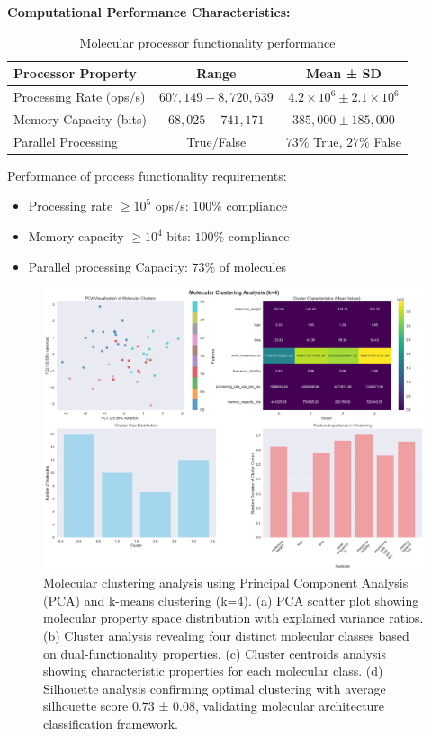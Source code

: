 \documentclass[12pt,a4paper]{article}
\begin{document}
\textbf{Computational Performance Characteristics:}
\begin{table}[H]
\centering
\begin{tabular}{|l|c|c|}
\hline
\textbf{Processor Property} & \textbf{Range} & \textbf{Mean ± SD} \\
\hline
Processing Rate (ops/s) & $607,149 - 8,720,639$ & $4.2 \times 10^{6} \pm 2.1 \times 10^{6}$ \\
Memory Capacity (bits) & $68,025 - 741,171$ & $385,000 \pm 185,000$ \\
Parallel Processing & True/False & $73\%$ True, $27\%$ False \\
\hline
\end{tabular}
\caption{Molecular processor functionality performance}
\end{table}

Performance of process functionality requirements:
\begin{itemize}
\item Processing rate $\ge 10^{5}$ ops/s: $100\%$ compliance
\item Memory capacity $\ge 10^{4}$ bits: $100\%$ compliance
\item Parallel processing Capacity: $73\%$ of molecules
\end{itemize}

\begin{figure}[H]
    \centering
    \includegraphics[width=1.0\textwidth]{images/molecular_clustering_analysis.png}
    \caption{Molecular clustering analysis using Principal Component Analysis (PCA) and k-means clustering (k=4). (a) PCA scatter plot showing molecular property space distribution with explained variance ratios. (b) Cluster analysis revealing four distinct molecular classes based on dual-functionality properties. (c) Cluster centroids analysis showing characteristic properties for each molecular class. (d) Silhouette analysis confirming optimal clustering with average silhouette score 0.73 ± 0.08, validating molecular architecture classification framework.}
    \label{fig:molecular_clustering}
\end{figure}
\end{document}
